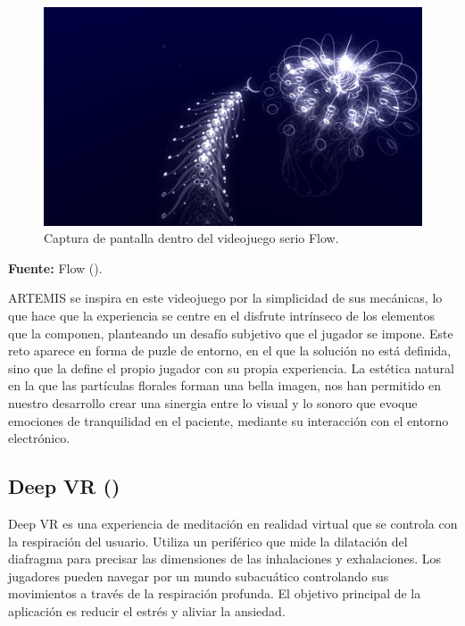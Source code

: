 \begin{figure}[h!]
	\centering
	\includegraphics[width=0.6\linewidth]{Figuras/Estado/Flow.jpg}
	\caption{Captura de pantalla dentro del videojuego serio Flow.}
	\label{fig:Flow}
	\vspace{-30pt}
\end{figure}

\begin{center}
	\textbf{Fuente:} Flow (\citeyear{FLOW:2006}).
	
\end{center}

ARTEMIS se inspira en este videojuego por la simplicidad de sus mecánicas, lo que hace que la experiencia se centre en el disfrute intrínseco de los elementos que la componen, planteando un desafío subjetivo que el jugador se impone. Este reto aparece en forma de puzle de entorno, en el que la solución no está definida, sino que la define el propio jugador con su propia experiencia. La estética natural en la que las partículas florales forman una bella imagen, nos han permitido en nuestro desarrollo crear una sinergia entre lo visual y lo sonoro que evoque emociones de tranquilidad en el paciente, mediante su interacción con el entorno electrónico. 

\subsection{Deep VR (\cite{DEEP:2021})}

Deep VR es una experiencia de meditación en realidad virtual que se controla con la respiración del usuario. Utiliza un periférico que mide la dilatación del diafragma para precisar las dimensiones de las inhalaciones y exhalaciones. Los jugadores pueden navegar por un mundo subacuático controlando sus movimientos a través de la respiración profunda. El objetivo principal de la aplicación es reducir el estrés y aliviar la ansiedad.

